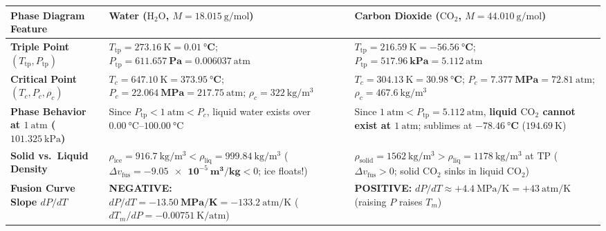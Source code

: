 \begin{center}
\label{tab:05:h2oco2}
\footnotesize\setlength{\tabcolsep}{4pt}\renewcommand{\arraystretch}{1.14}
\begin{tabularx}{\linewidth}{@{}l X X@{}}\toprule
\textbf{Phase Diagram Feature} & \textbf{Water ($\mathrm{H_2O}$, $M = \SI{18.015}{\gram\per\mole}$)} & \textbf{Carbon Dioxide ($\mathrm{CO_2}$, $M = \SI{44.010}{\gram\per\mole}$)} \\\midrule
\textbf{Triple Point $(T_{\mathrm{tp}}, P_{\mathrm{tp}})$} & $T_{\mathrm{tp}} = \SI{273.16}{\kelvin} = \mathbf{\SI{0.01}{\celsius}}$; $P_{\mathrm{tp}} = \mathbf{\SI{611.657}{\pascal}} = \SI{0.006037}{\text{atm}}$ & $T_{\mathrm{tp}} = \SI{216.59}{\kelvin} = \mathbf{-\SI{56.56}{\celsius}}$; $P_{\mathrm{tp}} = \mathbf{\SI{517.96}{\kilo\pascal}} = \SI{5.112}{\text{atm}}$ \\
\textbf{Critical Point $(T_c, P_c, \rho_c)$} & $T_c = \SI{647.10}{\kelvin} = \mathbf{\SI{373.95}{\celsius}}$; $P_c = \mathbf{\SI{22.064}{\mega\pascal}} = \SI{217.75}{\text{atm}}$; $\rho_c = \SI{322}{\kilogram\per\cubic\meter}$ & $T_c = \SI{304.13}{\kelvin} = \mathbf{\SI{30.98}{\celsius}}$; $P_c = \mathbf{\SI{7.377}{\mega\pascal}} = \SI{72.81}{\text{atm}}$; $\rho_c = \SI{467.6}{\kilogram\per\cubic\meter}$ \\
\textbf{Phase Behavior at $\SI{1}{\text{atm}}$ ($\SI{101.325}{\kilo\pascal}$)} & Since $P_{\mathrm{tp}} < \SI{1}{\text{atm}} < P_c$, liquid water exists over $\SI{0.00}{\celsius}\text{--}\SI{100.00}{\celsius}$ & Since $\SI{1}{\text{atm}} < P_{\mathrm{tp}} = \SI{5.112}{\text{atm}}$, \textbf{liquid $\mathrm{CO_2}$ cannot exist at $\SI{1}{\text{atm}}$}; sublimes at $\mathbf{-\SI{78.46}{\celsius}}$ ($\SI{194.69}{\kelvin}$) \\
\textbf{Solid vs.\ Liquid Density} & $\rho_{\mathrm{ice}} = \SI{916.7}{\kilogram\per\cubic\meter} < \rho_{\mathrm{liq}} = \SI{999.84}{\kilogram\per\cubic\meter}$ ($\Delta v_{\mathrm{fus}} = \mathbf{-\SI{9.05e-5}{\cubic\meter\per\kilogram}} < 0$; ice floats!) & $\rho_{\mathrm{solid}} = \SI{1562}{\kilogram\per\cubic\meter} > \rho_{\mathrm{liq}} = \SI{1178}{\kilogram\per\cubic\meter}$ at $\mathrm{TP}$ ($\Delta v_{\mathrm{fus}} > 0$; solid $\mathrm{CO_2}$ sinks in liquid $\mathrm{CO_2}$) \\
\textbf{Fusion Curve Slope $dP/dT$} & \textbf{NEGATIVE:} $dP/dT = \mathbf{-\SI{13.50}{\mega\pascal\per\kelvin}} = -\SI{133.2}{\text{atm}\per\kelvin}$ ($dT_m/dP = -\SI{0.00751}{\kelvin\per\text{atm}}$) & \textbf{POSITIVE:} $dP/dT \approx +\SI{4.4}{\mega\pascal\per\kelvin} = +\SI{43}{\text{atm}\per\kelvin}$ (raising $P$ raises $T_m$) \\

\end{tabularx}
\end{center}
